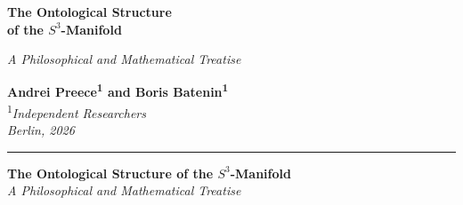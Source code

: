 \documentclass[12pt,a4paper]{article}
\theoremstyle{definition}
\begin{document}
\begin{titlepage}
\thispagestyle{empty}
\begin{center}

\vspace*{0.18\textheight}

{\LARGE\bfseries The Ontological Structure\\[0.25em]
of the \(S^3\)-Manifold}

\vspace{0.9em}
{\large\itshape A Philosophical and Mathematical Treatise}

\vspace{2.8em}

{\large\bfseries Andrei Preece\textsuperscript{1}
\quad and \quad Boris Batenin\textsuperscript{1}}\\[0.7em]
{\normalsize\textsuperscript{1}\itshape Independent Researchers}\\[1.2em]
{\normalsize\itshape Berlin, 2026}

\vspace{2.6em}
\rule{0.88\linewidth}{0.6pt}

\end{center}
\end{titlepage}

\clearpage
\thispagestyle{plain}
\setcounter{page}{2}

\begin{center}
{\large\bfseries The Ontological Structure of the \(S^3\)-Manifold}\\[0.3em]
{\normalsize\itshape A Philosophical and Mathematical Treatise}
\end{center}

\vspace{0.8em}
\end{document}
